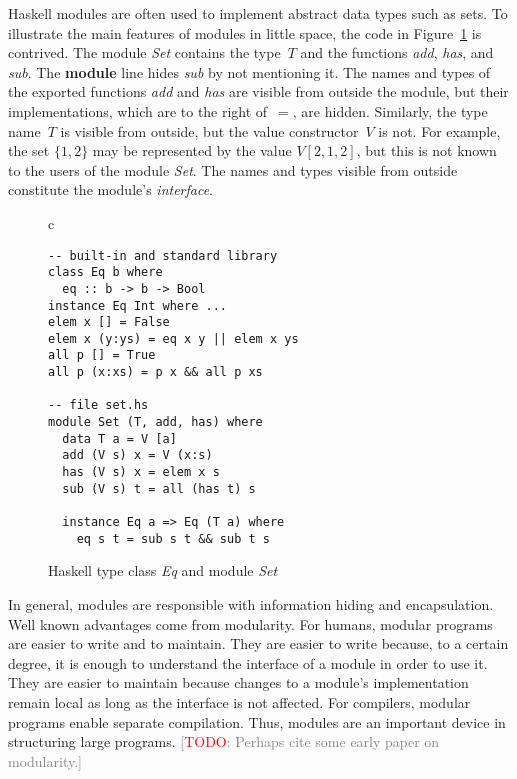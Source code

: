 \documentclass[conference,compsoc]{IEEEtran} %
\newcommand{\todo}[1]{{\small \textcolor{gray}{[\textcolor{red}{TODO}: #1]}}}
\begin{document}

Haskell modules are often used to implement abstract data types such as
sets.  To illustrate the main features of modules in little space, the code
in Figure~\ref{fig:haskell} is contrived.  The module \textit{Set} contains
the type~$T$ and the functions \textit{add}, \textit{has}, and
\textit{sub}. The \textbf{module} line hides \textit{sub} by not mentioning
it. The names and types of the exported functions \textit{add} and
\textit{has} are visible from outside the module, but their
implementations, which are to the right of~$=$, are hidden.  Similarly, the
type name~$T$ is visible from outside, but the value constructor~$V$ is
not. For example, the set $\{1,2\}$ may be represented by the value
$V[2,1,2]$, but this is not known to the users of the module \textit{Set}.
The names and types visible from outside constitute the module's
\emph{interface}.

\begin{figure}\footnotesize %
\begin{center}
\begin{tabular}{c}
\begin{lstlisting}[style=hs]
-- built-in and standard library
class Eq b where
  eq :: b -> b -> Bool
instance Eq Int where ...
elem x [] = False
elem x (y:ys) = eq x y || elem x ys
all p [] = True
all p (x:xs) = p x && all p xs

-- file set.hs
module Set (T, add, has) where
  data T a = V [a]
  add (V s) x = V (x:s)
  has (V s) x = elem x s
  sub (V s) t = all (has t) s

  instance Eq a => Eq (T a) where
    eq s t = sub s t && sub t s
\end{lstlisting}
\end{tabular}
\end{center}
\caption{Haskell type class \textit{Eq} and module \textit{Set}}
\label{fig:haskell}
\end{figure} %

In general, modules are responsible with information hiding and
encapsulation. Well known advantages come from modularity. For humans,
modular programs are easier to write and to maintain. They are easier to
write because, to a certain degree, it is enough to understand the
interface of a module in order to use it. They are easier to maintain
because changes to a module's implementation remain local as long as the
interface is not affected. For compilers, modular programs enable separate
compilation. Thus, modules are an important device in structuring large
programs. \todo{Perhaps cite some early paper on modularity.}
\end{document}
